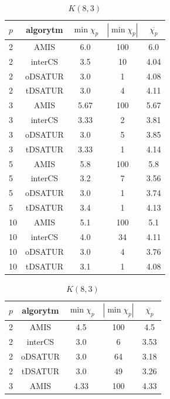 \documentclass[10pt,a4paper]{article}
\begin{document}
\begin{table}[H]
\begin{minipage}{.5\linewidth}
			\caption{$K(7,3)$}
		\end{minipage}%
		\begin{minipage}{.5\linewidth}
			\centering
			\begin{tabular}{|l|c|c|c|c|}
				\hline
				\textbf{$p$} & \textbf{algorytm} & \textbf{$\min \chi_{p}$} & \textbf{$|\min \chi_{p}|$} & \textbf{$\overline{\chi_{p}}$} \\
				\hline
				2 & AMIS & 6.0 & 100 & 6.0 \\
				2 & interCS & 3.5 & 10 & 4.04 \\
				2 & oDSATUR & 3.0 & 1 & 4.08 \\
				2 & tDSATUR & 3.0 & 4 & 4.11 \\
				\hline
				3 & AMIS & 5.67 & 100 & 5.67 \\
				3 & interCS & 3.33 & 2 & 3.81 \\
				3 & oDSATUR & 3.0 & 5 & 3.85 \\
				3 & tDSATUR & 3.33 & 1 & 4.14 \\
				\hline
				5 & AMIS & 5.8 & 100 & 5.8 \\
				5 & interCS & 3.2 & 7 & 3.56 \\
				5 & oDSATUR & 3.0 & 1 & 3.74 \\
				5 & tDSATUR & 3.4 & 1 & 4.13 \\
				\hline
				10 & AMIS & 5.1 & 100 & 5.1 \\
				10 & interCS & 4.0 & 34 & 4.11 \\
				10 & oDSATUR & 3.0 & 4 & 3.76 \\
				10 & tDSATUR & 3.1 & 1 & 4.08 \\
				\hline
			\end{tabular}
			\caption{$K(8,3)$}
		\end{minipage}
		\hspace{55pt}
		\begin{minipage}{\linewidth}
			\centering
			\begin{tabular}{|l|c|c|c|c|}
				\hline
				\textbf{$p$} & \textbf{algorytm} & \textbf{$\min \chi_{p}$} & \textbf{$|\min \chi_{p}|$} & \textbf{$\overline{\chi_{p}}$} \\
				\hline
				2 & AMIS & 4.5 & 100 & 4.5 \\
				2 & interCS & 3.0 & 6 & 3.53 \\
				2 & oDSATUR & 3.0 & 64 & 3.18 \\
				2 & tDSATUR & 3.0 & 49 & 3.26 \\
				\hline
				3 & AMIS & 4.33 & 100 & 4.33 \\

\end{tabular}
\end{minipage}
\end{table}
\end{document}
